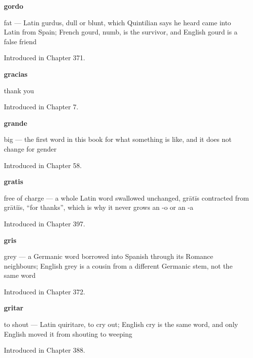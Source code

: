 \noindent\begin{minipage}[t]{\linewidth}
\raggedright
\textbf{gordo}\par
\small fat — Latin gurdus, dull or blunt, which Quintilian says he heard came into Latin from Spain; French gourd, numb, is the survivor, and English gourd is a false friend\par
\footnotesize Introduced in Chapter 371.
\end{minipage}\par\medskip

\noindent\begin{minipage}[t]{\linewidth}
\raggedright
\textbf{gracias}\par
\small thank you\par
\footnotesize Introduced in Chapter 7.
\end{minipage}\par\medskip

\noindent\begin{minipage}[t]{\linewidth}
\raggedright
\textbf{grande}\par
\small big — the first word in this book for what something is like, and it does not change for gender\par
\footnotesize Introduced in Chapter 58.
\end{minipage}\par\medskip

\noindent\begin{minipage}[t]{\linewidth}
\raggedright
\textbf{gratis}\par
\small free of charge — a whole Latin word swallowed unchanged, grātīs contracted from grātiīs, \textquotedblleft{}for thanks\textquotedblright{}, which is why it never grows an -o or an -a\par
\footnotesize Introduced in Chapter 397.
\end{minipage}\par\medskip

\noindent\begin{minipage}[t]{\linewidth}
\raggedright
\textbf{gris}\par
\small grey — a Germanic word borrowed into Spanish through its Romance neighbours; English grey is a cousin from a different Germanic stem, not the same word\par
\footnotesize Introduced in Chapter 372.
\end{minipage}\par\medskip

\noindent\begin{minipage}[t]{\linewidth}
\raggedright
\textbf{gritar}\par
\small to shout — Latin quiritare, to cry out; English cry is the same word, and only English moved it from shouting to weeping\par
\footnotesize Introduced in Chapter 388.
\end{minipage}\par\medskip

